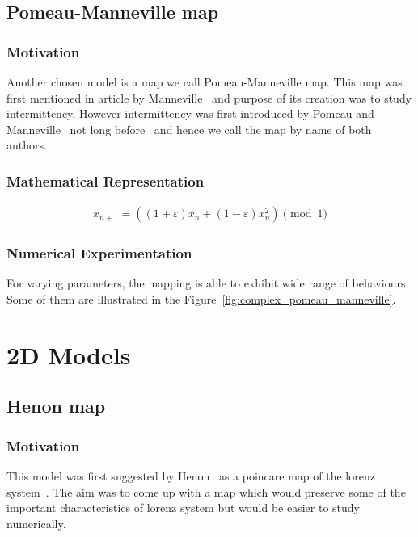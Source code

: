 \subsection{Pomeau-Manneville map}

\subsubsection{Motivation}
Another chosen model is a map we call Pomeau-Manneville map.
This map was first mentioned in article by Manneville~\cite{Manneville1980} and purpose of its creation was to study intermittency.
However intermittency was first introduced by Pomeau and Manneville~\cite{Pomeau1980} not long before~\cite{Manneville1980} and hence we call the map by name of both authors.

\subsubsection{Mathematical Representation}

\begin{align}
    x_{n+1} = ((1 + \varepsilon) x_{n} + (1 - \varepsilon) x_{n}^2) \pmod{1}
\end{align}

\subsubsection{Numerical Experimentation}
For varying parameters, the mapping is able to exhibit wide range of behaviours.
Some of them are illustrated in the Figure~\ref{fig:complex_pomeau_manneville}.

\section{2D Models}

\subsection{Henon map}

\subsubsection{Motivation}

This model was first suggested by Henon~\cite{Henon1976} as a poincare map of the lorenz system~\cite{Lorenz2004}.
The aim was to come up with a map which would preserve some of the important characteristics of lorenz system but would be easier to study numerically.

